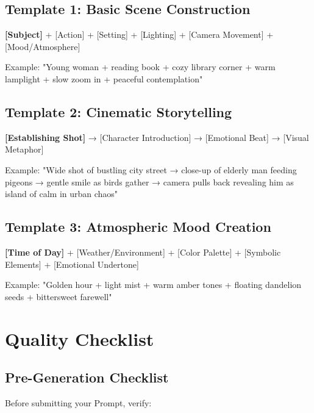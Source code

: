 \subsection*{Template 1: Basic Scene Construction}
\begin{Prompt}
\textbf{[Subject]} + [Action] + [Setting] + [Lighting] + [Camera Movement] + [Mood/Atmosphere]

Example: "Young woman + reading book + cozy library corner + warm lamplight + slow zoom in + peaceful contemplation"
\end{Prompt}

\subsection*{Template 2: Cinematic Storytelling}
\begin{Prompt}
\textbf{[Establishing Shot]} → [Character Introduction] → [Emotional Beat] → [Visual Metaphor]

Example: "Wide shot of bustling city street → close-up of elderly man feeding pigeons → gentle smile as birds gather → camera pulls back revealing him as island of calm in urban chaos"
\end{Prompt}

\subsection*{Template 3: Atmospheric Mood Creation}
\begin{Prompt}
\textbf{[Time of Day]} + [Weather/Environment] + [Color Palette] + [Symbolic Elements] + [Emotional Undertone]

Example: "Golden hour + light mist + warm amber tones + floating dandelion seeds + bittersweet farewell"
\end{Prompt}

\section*{Quality Checklist}

\subsection*{Pre-Generation Checklist}
Before submitting your Prompt, verify:

